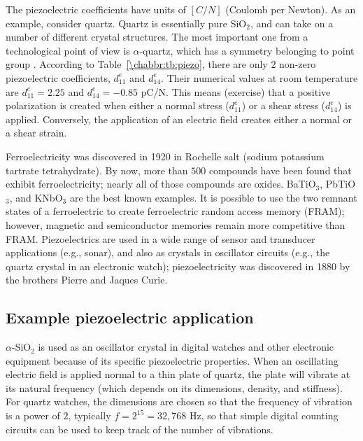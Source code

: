 The piezoelectric coefficients have units of $[C/N]$ (Coulomb per Newton).  As an example, consider quartz.  Quartz is essentially pure SiO$_2$, and can take on a number of different crystal structures.  The most important one from a technological point of view is $\alpha$-quartz, which has a symmetry belonging to point group . According to Table~\ref{\chabbr:tb:piezo}, there are only $2$ non-zero piezoelectric coefficients, $d^e_{11}$ and $d^e_{14}$.  Their numerical values at room temperature are $d^e_{11}=2.25$ and $d^e_{14}=-0.85$ pC/N. This means (exercise) that a positive polarization is created when either a normal stress ($d^e_{11}$) or a shear stress ($d^e_{14}$) is applied.  Conversely, the application of an electric field creates either a normal or a shear strain.

Ferroelectricity was discovered in 1920 in Rochelle salt (sodium potassium tartrate tetrahydrate). By now, more than $500$ compounds have been found that exhibit ferroelectricity; nearly all of those compounds are oxides. BaTiO$_3$, PbTiO$_3$, and KNbO$_3$ are the best known examples.  It is possible to use the two remnant  states of a ferroelectric to create ferroelectric random access memory (FRAM); however, magnetic and semiconductor memories remain more competitive than FRAM.  Piezoelectrics are used in a wide range of sensor and transducer applications (e.g., sonar), and also as crystals in oscillator circuits (e.g., the quartz crystal in an electronic watch); piezoelectricity was discovered in 1880 by the brothers Pierre and Jaques Curie.

\subsection{Example piezoelectric application}
$\alpha$-SiO$_2$ is used as an oscillator crystal in digital watches and other electronic equipment because of its specific piezoelectric properties.  When an oscillating electric field is applied normal to a thin plate of quartz, the plate will vibrate at its natural frequency (which depends on its dimensions, density, and stiffness).  For quartz watches, the dimensions are chosen so that the frequency of vibration is  a power of $2$, typically $f=2^{15}=32,768$ Hz, so that simple digital counting circuits can be used to keep track of the number of vibrations.

